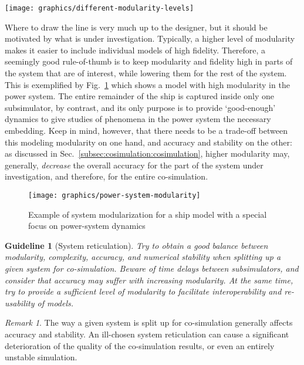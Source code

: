 \documentclass[prb,aps,showpacs,floatfix,twocolumn,10pt]{revtex4-1}
\newcommand{\sub}{subsimulator}
\newcommand{\guidelineReticulation}{%
	Try to obtain a good balance between modularity, complexity, accuracy, and numerical stability when splitting up a given system for co-simulation.
	Beware of time delays between \sub{}s, and consider that accuracy may suffer with increasing modularity.
	At the same time, try to provide a sufficient level of modularity to facilitate interoperability and re-usability of models.
}
\newlength{\graphicswidth}
\newlength{\graphicswidthfull}
\theoremstyle{plain}
\newtheorem{guideline}{Guideline}
\theoremstyle{remark}
\newtheorem{remark}{Remark}[guideline]
\begin{document}
\begin{figure*}[h!tb]
  \texttt{[image: graphics/different-modularity-levels]}
  \caption{%
  	Different levels of modeled modularity of systems on board a ship
  }
  \label{fig:different-modularity-levels}
\end{figure*}

Where to draw the line is very much up to the designer, but it should be motivated by what is under investigation.
Typically, a higher level of modularity makes it easier to include individual models of high fidelity.
Therefore, a seemingly good rule-of-thumb is to keep modularity and fidelity high in parts of the system that are of interest, while lowering them for the rest of the system.
This is exemplified by Fig.~\ref{fig:power-system-modularity} which shows a model with high modularity in the power system.
The entire remainder of the ship is captured inside only one \sub{}, by contrast, and its only purpose is to provide `good-enough' dynamics to give studies of phenomena in the power system the necessary embedding.
Keep in mind, however, that there needs to be a trade-off between this modeling modularity on one hand, and accuracy and stability on the other:
as discussed in Sec.~\ref{subsec:cosimulation:cosimulation}, higher modularity may, generally, \emph{decrease} the overall accuracy for the part of the system under investigation, and therefore, for the entire co-simulation.

\begin{figure}[h!tb]
  \texttt{[image: graphics/power-system-modularity]}
  \caption{%
  	Example of system modularization for a ship model with a special focus on power-system dynamics
  }
  \label{fig:power-system-modularity}
\end{figure}

\begin{guideline}[System reticulation]
\label{guideline:Reticulation}
	\guidelineReticulation{}
\end{guideline}

\begin{remark}
	The way a given system is split up for co-simulation generally affects accuracy and stability.
	An ill-chosen system reticulation can cause a significant deterioration of the quality of the co-simulation results, or even an entirely unstable simulation. 
\end{remark}
\end{document}
